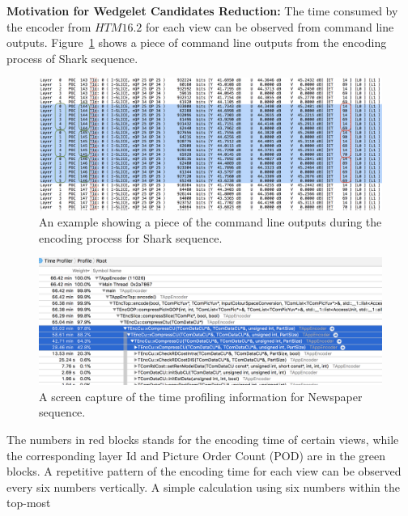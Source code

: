 \textbf{Motivation for Wedgelet Candidates Reduction:} The time
consumed by the encoder from \(HTM16.2\) for
each view can be observed from command line outputs.
Figure~\ref{fig:encoding-time-example} shows a piece of command line outputs
from the encoding process of Shark sequence.
\begin{figure}
    \centering
    \includegraphics[width=\textwidth,height=\textheight,keepaspectratio]{Figures/EncodingTimeEg}
    \caption[An example showing a piece of the command line outputs during
    the encoding process for Shark sequence]
    {An example showing a piece of the command line outputs during the
    encoding process for Shark sequence.
    }\label{fig:encoding-time-example}
\end{figure}
\begin{figure}[!b]
    \centering
    \includegraphics[width=\textwidth,height=\textheight,keepaspectratio]{Figures/major-time-spent-in-recursive-xcompresscu}
    \caption[A screen capture of the time profiling information for Newspaper sequence]
    {A screen capture of the time profiling information for Newspaper sequence.
    }\label{fig:major-time-spent-in-recursive-comresscu}
\end{figure}
The numbers in red blocks stands for the encoding time of certain views, while
the corresponding layer Id and Picture Order Count (POD) are in the green
blocks.
A repetitive pattern of the encoding time for each view can be observed
every six numbers vertically.
A simple calculation using six numbers within the top-most
